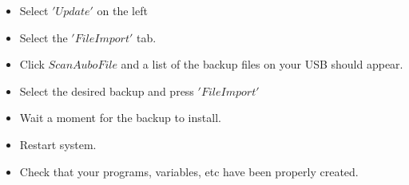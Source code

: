 \documentclass{article}
\begin{document}
\begin{itemize}
\begin{center}
\end{center}
\item Select $'Update'$ on the left
\begin{center}
\end{center}
\item Select the $'File Import'$ tab.
\begin{center}
\end{center}
\item Click $Scan Aubo File$ and a list of the backup files on your USB should appear. 
\item Select the desired backup and press $'File Import'$
\item Wait a moment for the backup to install. 
\item Restart system. 
\item Check that your programs, variables, etc have been properly created.
\end{itemize}
\end{document}

